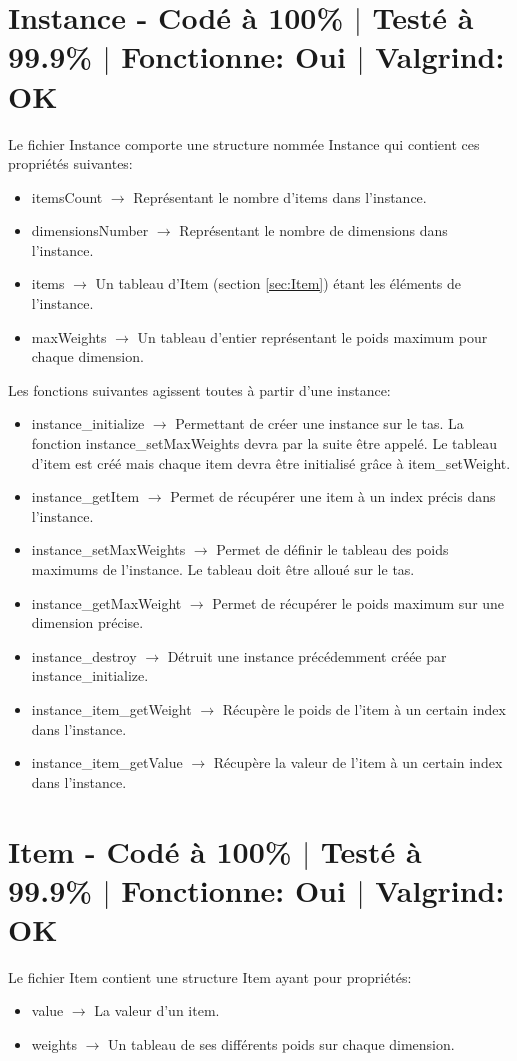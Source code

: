 \documentclass{EPUProjetPeiP}
\newcommand{\comp}[5]{
	\section[#1]{#1 {\small - Codé à #2\% $\vert$ Testé à #3\% $\vert$ Fonctionne: #4 $\vert$ Valgrind: #5}}
}
\begin{document}
\comp{Instance}{100}{99.9}{Oui}{OK}
Le fichier Instance comporte une structure nommée Instance qui contient ces propriétés suivantes:
\begin{itemize}
	\item itemsCount $\longrightarrow$ Représentant le nombre d'items dans l'instance.
	\item dimensionsNumber $\longrightarrow$ Représentant le nombre de dimensions dans l'instance.
	\item items $\longrightarrow$ Un tableau d'Item (section \ref{sec:Item}) étant les éléments de l'instance.
	\item maxWeights $\longrightarrow$ Un tableau d'entier représentant le poids maximum pour chaque dimension.\\
\end{itemize}

Les fonctions suivantes agissent toutes à partir d'une instance:
\begin{itemize}
	\item instance\_initialize $\longrightarrow$ Permettant de créer une instance sur le tas. La fonction instance\_setMaxWeights devra par la suite être appelé. Le tableau d'item est créé mais chaque item devra être initialisé grâce à item\_setWeight.
	\item instance\_getItem $\longrightarrow$ Permet de récupérer une item à un index précis dans l'instance.
	\item instance\_setMaxWeights $\longrightarrow$ Permet de définir le tableau des poids maximums de l'instance. Le tableau doit être alloué sur le tas.
	\item instance\_getMaxWeight $\longrightarrow$ Permet de récupérer le poids maximum sur une dimension précise.
	\item instance\_destroy $\longrightarrow$ Détruit une instance précédemment créée par instance\_initialize.
	\item instance\_item\_getWeight $\longrightarrow$ Récupère le poids de l'item à un certain index dans l'instance.
	\item instance\_item\_getValue $\longrightarrow$ Récupère la valeur de l'item à un certain index dans l'instance.
\end{itemize}

\comp{Item \label{sec:Item}}{100}{99.9}{Oui}{OK}
Le fichier Item contient une structure Item ayant pour propriétés:
\begin{itemize}
	\item value $\longrightarrow$ La valeur d'un item.
	\item weights $\longrightarrow$ Un tableau de ses différents poids sur chaque dimension.\\
\end{itemize}
\end{document}
